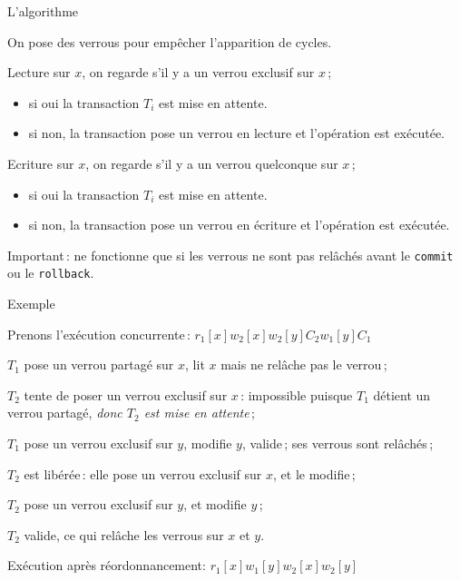 \begin{frame}{L'algorithme}

On pose des verrous pour empêcher l'apparition de cycles.


\begin{redbullet}
	\item \alert{Lecture} sur $x$,
            on regarde s'il y a un verrou \alert{exclusif} sur $x$\,;
	\begin{itemize}
		\item si oui la transaction $T_i$ 
	                est mise en attente.
		\item si non, la transaction pose un verrou en lecture
		       et l'opération est exécutée.
	\end{itemize}
	\item \alert{Ecriture} sur $x$,
              on regarde s'il y a un verrou \alert{quelconque}  sur $x$\,;
	\begin{itemize}
		\item si oui la transaction $T_i$ 
	                est mise en attente.
		\item si non, la transaction pose un verrou en écriture
		       et l'opération est exécutée.
	\end{itemize}
\end{redbullet}

\vfill

\begin{blocgauche}
\alert{Important}\,: ne fonctionne que si les verrous ne sont pas
relâchés avant le \texttt{commit} ou le \texttt{rollback}.
\end{blocgauche}
\end{frame}


\begin{frame}{Exemple}

Prenons l'exécution concurrente\,:  $r_1[x] w_2[x] w_2[y] C_2 w_1[y] C_1$

\vfill

\begin{redbullet}
  \item $T_1$ pose un verrou partagé sur $x$, lit $x$
          mais ne relâche pas le verrou\,;
  \item $T_2$ tente de poser un verrou exclusif sur $x$\,:
              impossible puisque $T_1$ détient un verrou partagé,
                 {\em donc $T_2$ est mise en attente}\,;
  \item $T_1$ pose un verrou exclusif sur $y$, modifie $y$,
            valide\,;  ses verrous  
            sont relâchés\,;
  \item $T_2$ est libérée\,: elle pose un verrou exclusif sur $x$, et 
              le modifie\,;
  \item $T_2$ pose un verrou exclusif sur $y$, et modifie $y$\,;
  \item $T_2$ valide, ce qui relâche les verrous sur $x$ et $y$.
\end{redbullet}

Exécution après réordonnancement: $r_1[x] w_1[y] w_2[x] w_2[y]$
\end{frame}



